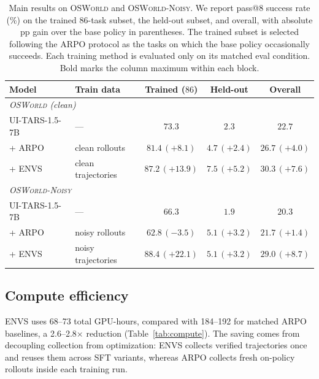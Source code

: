 \documentclass[11pt]{article}
\begin{document}
\begin{table}[H]
  \caption{Main results on \textsc{OSWorld} and \textsc{OSWorld-Noisy}. We
  report pass@8 success rate (\%) on the trained 86-task subset, the
  held-out subset, and overall, with absolute pp gain over the base
  policy in parentheses. The trained subset is selected following the
  ARPO protocol as the tasks on which the base policy occasionally
  succeeds. Each training method is evaluated only on its matched eval
  condition. Bold marks the column maximum within each block.}
  \label{tab:main-results}
  \centering
  \small
  \begin{tabular}{llccc}
    \toprule
    Model           & Train data         & Trained ($86$)            & Held-out                 & Overall                    \\
    \midrule
    \multicolumn{5}{l}{\textit{\textsc{OSWorld} (clean)}} \\
    UI-TARS-1.5-7B  & ---                & $73.3$                    & $2.3$                    & $22.7$                     \\
    + ARPO          & clean rollouts     & $81.4\,(+8.1)$            & $4.7\,(+2.4)$            & $26.7\,(+4.0)$             \\
    + ENVS          & clean trajectories & $\mathbf{87.2\,(+13.9)}$  & $\mathbf{7.5\,(+5.2)}$   & $\mathbf{30.3\,(+7.6)}$    \\
    \midrule
    \multicolumn{5}{l}{\textit{\textsc{OSWorld-Noisy}}} \\
    UI-TARS-1.5-7B  & ---                & $66.3$                    & $1.9$                    & $20.3$                     \\
    + ARPO          & noisy rollouts     & $62.8\,(-3.5)$            & $5.1\,(+3.2)$            & $21.7\,(+1.4)$             \\
    + ENVS          & noisy trajectories & $\mathbf{88.4\,(+22.1)}$  & $\mathbf{5.1\,(+3.2)}$   & $\mathbf{29.0\,(+8.7)}$    \\
    \bottomrule
  \end{tabular}
\end{table}


\subsection{Compute efficiency}
\label{sec:compute}

ENVS uses 68--73 total GPU-hours, compared with 184--192 for matched
ARPO baselines, a 2.6--2.8$\times$ reduction (Table~\ref{tab:compute}).
The saving comes from decoupling collection from optimization: ENVS
collects verified trajectories once and reuses them across SFT variants,
whereas ARPO collects fresh on-policy rollouts inside each training run.
\end{document}
